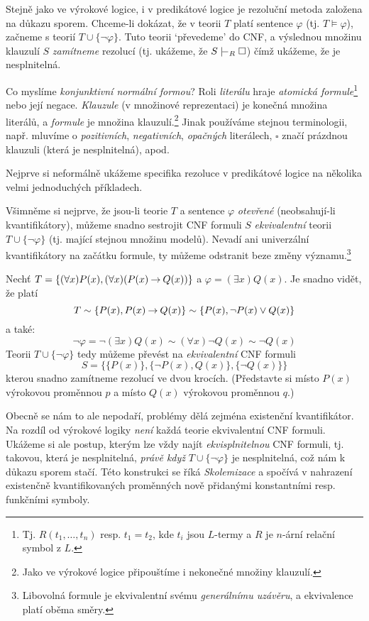 Stejně jako ve výrokové logice, i v predikátové logice je rezoluční metoda založena na důkazu sporem. Chceme-li dokázat, že v teorii $T$ platí sentence $\varphi$ (tj. $T\models\varphi$), začneme s teorií $T\cup\{\neg \varphi\}$. Tuto teorii `převedeme' do CNF, a výslednou množinu klauzulí $S$ \emph{zamítneme} rezolucí (tj. ukážeme, že $S\proves_R\square$) čímž ukážeme, že je nesplnitelná.

Co myslíme \emph{konjunktivní normální formou}? Roli \emph{literálu} hraje \emph{atomická formule}\footnote{Tj. $R(t_1,\dots,t_n)$ resp. $t_1=t_2$, kde $t_i$ jsou $L$-termy a $R$ je $n$-ární relační symbol z $L$.} nebo její negace. \emph{Klauzule} (v množinové reprezentaci) je konečná množina literálů, a \emph{formule} je množina klauzulí.\footnote{Jako ve výrokové logice připouštíme i nekonečné množiny klauzulí.} Jinak používáme stejnou terminologii, např. mluvíme o \emph{pozitivních}, \emph{negativních}, \emph{opačných} literálech, $\square$ značí prázdnou klauzuli (která je nesplnitelná), apod.

Nejprve si neformálně ukážeme specifika rezoluce v predikátové logice na několika velmi jednoduchých příkladech.

Všimněme si nejprve, že jsou-li teorie $T$ a sentence $\varphi$ \emph{otevřené} (neobsahují-li kvantifikátory), můžeme snadno sestrojit CNF formuli $S$ \emph{ekvivalentní} teorii $T\cup\{\neg \varphi\}$ (tj. mající stejnou množinu modelů). Nevadí ani univerzální kvantifikátory na začátku formule, ty můžeme odstranit beze změny významu.\footnote{Libovolná formule je ekvivalentní svému \emph{generálnímu uzávěru}, a ekvivalence platí oběma směry.}

\begin{example}
    Nechť $T=\{(\forall x)P(x),(\forall x)(P(x)\mathbin{\rightarrow} Q(x))\}$ a $\varphi=(\exists x)Q(x)$. Je snadno vidět, že platí
    $$
    T\sim \{P(x),P(x)\mathbin{\rightarrow} Q(x)\}\sim\{P(x),\neg P(x)\lor Q(x)\}
    $$
    a také:
    $$\neg\varphi=\neg(\exists x)Q(x)\sim(\forall x)\neg Q(x)\sim\neg Q(x)$$
    Teorii $T\cup\{\neg \varphi\}$ tedy můžeme převést na \emph{ekvivalentní} CNF formuli
    $$
    S = \{\{P(x)\},\{\neg P(x),Q(x)\},\{\neg Q(x)\}\}
    $$
    kterou snadno zamítneme rezolucí ve dvou krocích. (Představte si místo $P(x)$ výrokovou proměnnou $p$ a místo $Q(x)$ výrokovou proměnnou $q$.)
\end{example}

Obecně se nám to ale nepodaří, problémy dělá zejména existenční kvantifikátor. Na rozdíl od výrokové logiky \emph{není} každá teorie ekvivalentní CNF formuli. Ukážeme si ale postup, kterým lze vždy najít \emph{ekvisplnitelnou} CNF formuli, tj. takovou, která je nesplnitelná, \emph{právě když} $T\cup\{\neg \varphi\}$ je nesplnitelná, což nám k důkazu sporem stačí. Této konstrukci se říká \emph{Skolemizace} a spočívá v nahrazení existenčně kvantifikovaných proměnných nově přidanými konstantními resp. funkčními symboly.


